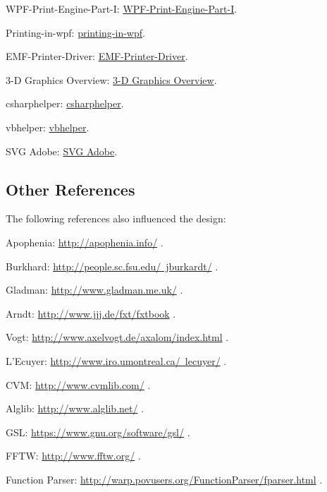 WPF-Print-Engine-Part-I: \href{http://www.codeproject.com/Articles/238135/WPF-Print-Engine-Part-I}{WPF-Print-Engine-Part-I}.

Printing-in-wpf: \href{http://tech.pro/tutorial/881/printing-in-wpf}{printing-in-wpf}.

EMF-Printer-Driver: \href{http://www.softpedia.com/get/Office-tools/Other-Office-Tools/EMF-Printer-Driver.shtml}{EMF-Printer-Driver}.

3-D Graphics Overview: \href{http://msdn.microsoft.com/en-us/library/ms747437%28v=vs.100%29.aspx}{3-D Graphics Overview}.
	
	csharphelper: \href{http://www.csharphelper.com/}{csharphelper}.
	
	vbhelper: \href{http://www.vb-helper.com/index.html}{vbhelper}.
	
	SVG Adobe: \href{http://www.iegallery.com/en-gb/Addons/Details/444}{SVG Adobe}.
	
	
	\subsection{Other References}
	The following references also influenced the design:
	
	Apophenia: \href{http://apophenia.info/}{http://apophenia.info/} .
	
	Burkhard: \href{http://people.sc.fsu.edu/~jburkardt/}{http://people.sc.fsu.edu/~jburkardt/} .
	
	Gladman: \href{http://www.gladman.me.uk/}{http://www.gladman.me.uk/} .
	
	Arndt: \href{http://www.jjj.de/fxt/#fxtbook}{http://www.jjj.de/fxt/fxtbook} .
	
	Vogt: \href{http://www.axelvogt.de/axalom/index.html}{http://www.axelvogt.de/axalom/index.html} .
	
	L'Ecuyer: \href{http://www.iro.umontreal.ca/~lecuyer/}{http://www.iro.umontreal.ca/~lecuyer/} .
	
	CVM: \href{http://www.cvmlib.com/}{http://www.cvmlib.com/} .
	
	Alglib: \href{http://www.alglib.net/}{http://www.alglib.net/} .
	
	GSL: \href{https://www.gnu.org/software/gsl/}{https://www.gnu.org/software/gsl/} .
	
	FFTW: \href{http://www.fftw.org/}{http://www.fftw.org/} .
	
	Function Parser: \href{http://warp.povusers.org/FunctionParser/fparser.html}{http://warp.povusers.org/FunctionParser/fparser.html} .
	
